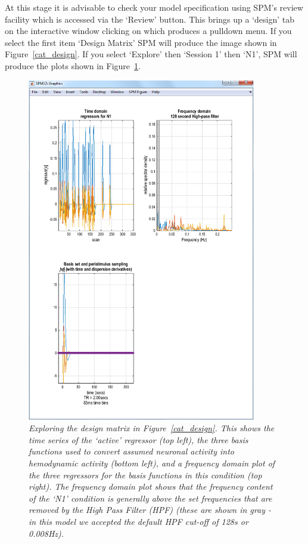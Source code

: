 \documentclass[a4paper,titlepage]{book}
\begin{document}
At this stage it is advisable to check your model specification
using SPM's review facility which is accessed via
the `Review' button. This brings up a `design' tab on the 
interactive window clicking on which produces a pulldown
menu. If you select the first item `Design Matrix' SPM will 
produce the image shown in Figure~\ref{cat_design}. 
If you select `Explore' then `Session 1' then `N1', SPM will produce 
the plots shown in Figure~\ref{cat_explore}.
\begin{figure}
\begin{center}
\includegraphics[width=100mm]{faces/cat_explore}
\caption{\em Exploring the design matrix in Figure~\ref{cat_design}. This shows the time series of 
the `active' regressor (top left), the three basis functions used to convert assumed neuronal activity into hemodynamic activity (bottom left), and a frequency domain plot of the three regressors for the basis functions in this condition (top right). The frequency domain plot shows that the 
frequency content of the `N1' condition is generally above the set frequencies that are removed by the High Pass 
Filter (HPF) (these are shown in gray - in this model we accepted the default HPF cut-off of 128s or 
0.008Hz). \label{cat_explore}}
\end{center}
\end{figure}
\end{document}
